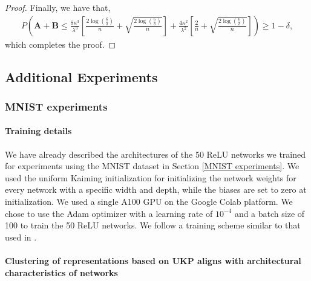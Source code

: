 \documentclass{article}
\theoremstyle{plain}
\begin{document}
\begin{proof}
Finally, we have that,
\[
\begin{aligned}
P\left(\mathbf{A}+\mathbf{B} \leq \frac{8\kappa^{3}}{\lambda^{3}}\left[\frac{2\log(\frac{6}{\delta})}{n} + \sqrt{\frac{2\log(\frac{6}{\delta})}{n}}\right] + \frac{4\kappa^{2}}{\lambda^{2}}\left[\frac{2}{n} + \sqrt{\frac{2\log(\frac{6}{\delta})}{n}}\right]\right)
\geq 1-\delta,
\end{aligned}
\]
which completes the proof.
\end{proof}

\subsection{Additional Experiments}

\subsubsection{MNIST experiments}
\label{MNIST Experiments additional}

\paragraph{Training details} We have already described the architectures of the 50 ReLU networks we trained for experiments using the MNIST dataset in Section \ref{MNIST experiments}. We used the uniform Kaiming initialization \cite{he2015delving} for initializing the network weights for every network with a specific width and depth, while the biases are set to zero at initialization. We used a single A100 GPU on the Google Colab platform. We chose to use the Adam optimizer with a learning rate of $10^{-4}$ and a batch size of 100 to train the 50 ReLU networks. We follow a training scheme similar to that used in \citet{GULP}.

\paragraph{Clustering of representations based on UKP aligns with architectural characteristics of networks}
\end{document}
